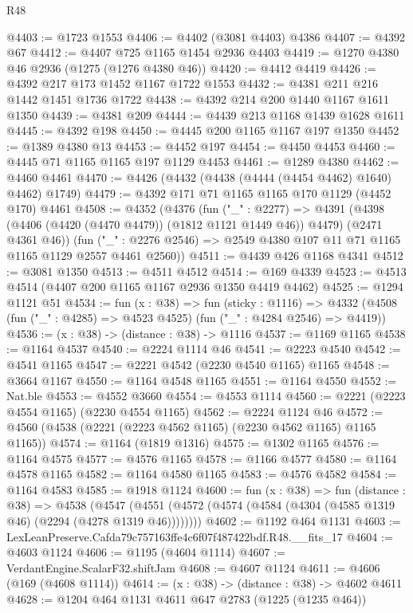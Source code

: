 \begin{lexlean}{R48}
\begin{coremodule}
@4403 := @1723 @1553
@4406 := @4402 (@3081 @4403) @4386
@4407 := @4392 @67
@4412 := @4407 @725 @1165 @1454 @2936 @4403
@4419 := @1270 @4380 @46 @2936 (@1275 (@1276 @4380 @46))
@4420 := @4412 @4419
@4426 := @4392 @217 @173 @1452 @1167 @1722 @1553
@4432 := @4381 @211 @216 @1442 @1451 @1736 @1722
@4438 := @4392 @214 @200 @1440 @1167 @1611 @1350
@4439 := @4381 @209
@4444 := @4439 @213 @1168 @1439 @1628 @1611
@4445 := @4392 @198
@4450 := @4445 @200 @1165 @1167 @197 @1350
@4452 := @1389 @4380 @13
@4453 := @4452 @197
@4454 := @4450 @4453
@4460 := @4445 @71 @1165 @1165 @197 @1129 @4453
@4461 := @1289 @4380
@4462 := @4460 @4461
@4470 := @4426 (@4432 (@4438 (@4444 (@4454 @4462) @1640) @4462) @1749)
@4479 := @4392 @171 @71 @1165 @1165 @170 @1129 (@4452 @170) @4461
@4508 := @4352
    (@4376
      (fun ("_" : @2277) =>
      @4391 (@4398 (@4406 (@4420 (@4470 @4479)) (@1812 @1121 @1449 @46)) @4479) (@2471 @4361 @46))
      (fun ("_" : @2276 @2546) => @2549 @4380 @107 @11 @71 @1165 @1165 @1129 @2557 @4461 @2560))
@4511 := @4439 @426 @1168 @4341
@4512 := @3081 @1350
@4513 := @4511 @4512
@4514 := @169 @4339
@4523 := @4513 @4514 (@4407 @200 @1165 @1167 @2936 @1350 @4419 @4462)
@4525 := @1294 @1121 @51
@4534 := fun (x : @38) =>
  fun (sticky : @1116) =>
  @4332 (@4508 (fun ("_" : @4285) => @4523 @4525) (fun ("_" : @4284 @2546) => @4419))
@4536 := (x : @38) -> (distance : @38) -> @1116
@4537 := @1169 @1165
@4538 := @1164 @4537
@4540 := @2224 @1114 @46
@4541 := @2223 @4540
@4542 := @4541 @1165
@4547 := @2221 @4542 (@2230 @4540 @1165) @1165
@4548 := @3664 @1167
@4550 := @1164 @4548 @1165
@4551 := @1164 @4550
@4552 := Nat.ble
@4553 := @4552 @3660
@4554 := @4553 @1114
@4560 := @2221 (@2223 @4554 @1165) (@2230 @4554 @1165)
@4562 := @2224 @1124 @46
@4572 := @4560 (@4538 (@2221 (@2223 @4562 @1165) (@2230 @4562 @1165) @1165 @1165))
@4574 := @1164 (@1819 @1316)
@4575 := @1302 @1165
@4576 := @1164 @4575
@4577 := @4576 @1165
@4578 := @1166 @4577
@4580 := @1164 @4578 @1165
@4582 := @1164 @4580 @1165
@4583 := @4576 @4582
@4584 := @1164 @4583
@4585 := @1918 @1124
@4600 := fun (x : @38) =>
  fun (distance : @38) =>
  @4538 (@4547 (@4551 (@4572 (@4574 (@4584 (@4304 (@4585 @1319 @46) (@2294 (@4278 @1319 @46))))))))
@4602 := @1192 @464 @1131
@4603 := LexLeanPreserve.Cafda79c757163ffe4c6f07f487422bdf.R48.__fits_17
@4604 := @4603 @1124
@4606 := @1195 (@4604 @1114)
@4607 := VerdantEngine.ScalarF32.shiftJam
@4608 := @4607 @1124
@4611 := @4606 (@169 (@4608 @1114))
@4614 := (x : @38) -> (distance : @38) -> @4602 @4611
@4628 := @1204
    @464
    @1131
    @4611
    @647
    @2783
    (@1225 (@1235 @464))

\end{coremodule}
\end{lexlean}
